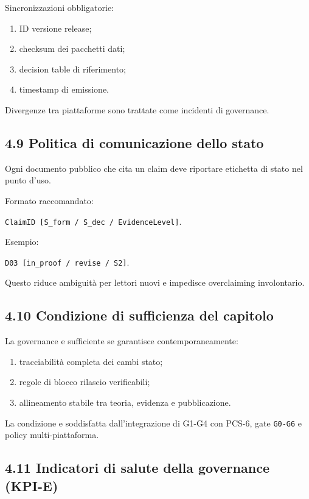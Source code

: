 Sincronizzazioni obbligatorie:

\begin{enumerate}
\def\labelenumi{\arabic{enumi}.}
\tightlist
\item
  ID versione release;
\item
  checksum dei pacchetti dati;
\item
  decision table di riferimento;
\item
  timestamp di emissione.
\end{enumerate}

Divergenze tra piattaforme sono trattate come incidenti di governance.

\subsection{4.9 Politica di comunicazione dello stato}

Ogni documento pubblico che cita un claim deve riportare etichetta di stato nel punto d'uso.

Formato raccomandato:

\texttt{ClaimID\ {[}S\_form\ /\ S\_dec\ /\ EvidenceLevel{]}}.

Esempio:

\texttt{D03\ {[}in\_proof\ /\ revise\ /\ S2{]}}.

Questo riduce ambiguità per lettori nuovi e impedisce overclaiming involontario.

\subsection{4.10 Condizione di sufficienza del capitolo}

La governance e sufficiente se garantisce contemporaneamente:

\begin{enumerate}
\def\labelenumi{\arabic{enumi}.}
\tightlist
\item
  tracciabilità completa dei cambi stato;
\item
  regole di blocco rilascio verificabili;
\item
  allineamento stabile tra teoria, evidenza e pubblicazione.
\end{enumerate}

La condizione e soddisfatta dall'integrazione di G1-G4 con PCS-6, gate \texttt{G0-G6} e policy multi-piattaforma.

\subsection{4.11 Indicatori di salute della governance (KPI-E)}

